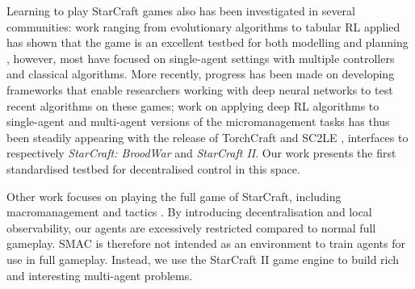 Learning to play StarCraft games also has been investigated in several
communities: work ranging from evolutionary algorithms to tabular
RL applied has shown that the game is an excellent testbed
for both modelling and planning \citep{ontanon2013survey}, however, most have
focused on single-agent settings with multiple controllers and classical
algorithms.
More recently, progress has been made on developing frameworks that enable
researchers working with deep neural networks to test recent algorithms on these
games; work on applying deep RL algorithms to single-agent and multi-agent
versions of the micromanagement tasks has thus been steadily appearing
\citep{usunier2016episodic, foerster_stabilising_2017,
foerster_counterfactual_2017, rashid_qmix:_2018, nardelli2018value,
hu2018knowledge, shao2018starcraft, foerster2018multi} with the release of
TorchCraft \citep{synnaeve_torchcraft:_2016} and SC2LE
\citep{vinyals_starcraft_2017}, interfaces to respectively \emph{StarCraft:
BroodWar} and \emph{StarCraft II}. Our work presents the first standardised
testbed for decentralised control in this space.

Other work focuses on playing the full game of StarCraft, including 
macromanagement and tactics 
\citep{pang2018reinforcement,sun2018tstarbots,alphastar}. 
By introducing decentralisation and local observability, our agents 
are excessively restricted compared to normal full gameplay. SMAC is therefore 
not intended as an environment to train agents for use in full gameplay. 
Instead, we use the StarCraft II game engine to build rich and interesting 
multi-agent problems.